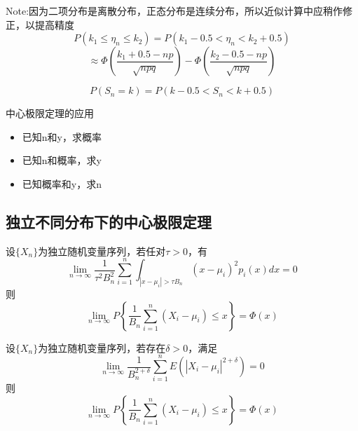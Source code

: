 Note:因为二项分布是离散分布，正态分布是连续分布，所以近似计算中应稍作修正，以提高精度
$$P(k_1 \leqslant \eta _n \leqslant k_2) = P(k_1 - 0.5 < \eta _n < k_2 + 0.5)$$$$ \approx \Phi(\frac{k_1 + 0.5-np}{\sqrt{npq} })-\Phi(\frac{k_2 - 0.5-np}{\sqrt{npq} })$$

$$P(S_n=k)=P(k-0.5 < S_n < k+0.5)$$

中心极限定理的应用
\begin{itemize}
    \item 已知n和y，求概率
    \item 已知n和概率，求y
    \item 已知概率和y，求n
\end{itemize}

\subsection{独立不同分布下的中心极限定理}
\begin{theorem}[林德伯格中心极限定理]
    设$\{X_n\}$为独立随机变量序列，若任对$\tau > 0$，有$$\mathop {\lim }\limits_{n \to \infty } \frac{1}{{{\tau ^2}B_n^2}}\sum\limits_{i = 1}^n {\int_{\left| {x - {\mu _i}} \right| > \tau {B_n}} {{{(x - {\mu _i})}^2}{p_i}(x)} } dx = 0$$则$$\mathop {\lim }\limits_{n \to \infty } P\left\{ {\frac{1}{{{B_n}}}\sum\limits_{i = 1}^n {({X_i} - {\mu _i})}  \leqslant x} \right\} = \Phi (x)$$
\end{theorem}

\begin{theorem}[李雅普诺夫中心极限定理]
    设$\{X_n\}$为独立随机变量序列，若存在$\delta>0$，满足$$\mathop {\lim }\limits_{n \to \infty } \frac{1}{{B_n^{2 + \delta }}}\sum\limits_{i = 1}^n {E\left( {{{\left| {{X_i} - {\mu_i }} \right|}^{2 + \delta }}} \right)}  = 0$$则$$\mathop {\lim }\limits_{n \to \infty } P\left\{ {\frac{1}{{{B_n}}}\sum\limits_{i = 1}^n {({X_i} - {\mu _i})}  \leqslant x} \right\} = \Phi (x)$$
\end{theorem}
